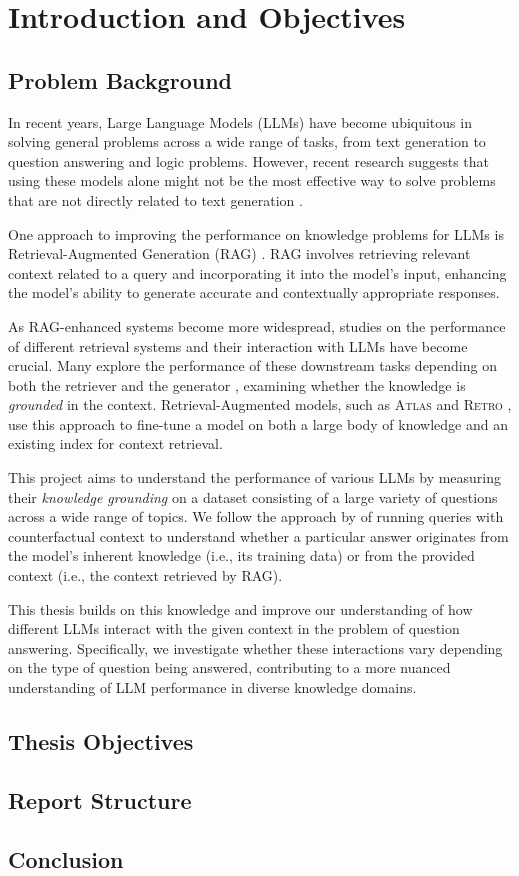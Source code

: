 \section{Introduction and Objectives}

\subsection{Problem Background}

In recent years, Large Language Models (LLMs) have become ubiquitous in solving general problems across a wide range of tasks, from text generation to question answering and logic problems.
However, recent research suggests that using these models alone might not be the most effective way to solve problems that are not directly related to text generation \citep{treeofthoughts}.

One approach to improving the performance on knowledge problems for LLMs is Retrieval-Augmented Generation (RAG) \citep{rag}. RAG involves retrieving relevant context related to a query and incorporating it into the model's input, enhancing the model's ability to generate accurate and contextually appropriate responses.

As RAG-enhanced systems become more widespread, studies on the performance of different retrieval systems and their interaction with LLMs have become crucial.
Many explore the performance of these downstream tasks depending on both the retriever and the generator \citep{can_rag_models_reason,fewshotlearners}, examining whether the knowledge is \textit{grounded} in the context.
Retrieval-Augmented models, such as \textsc{Atlas} \citep{atlas_foundational} and \textsc{Retro} \citep{retro}, use this approach to fine-tune a model on both a large body of knowledge and an existing index for context retrieval.

This project aims to understand the performance of various LLMs by measuring their \textit{knowledge grounding} on a dataset consisting of a large variety of questions across a wide range of topics.
We follow the approach by \citeauthor{factual_recall} of running queries with counterfactual context to understand whether a particular answer originates from the model's inherent knowledge (i.e., its training data) or from the provided context (i.e., the context retrieved by RAG).

This thesis builds on this knowledge and improve our understanding of how different LLMs interact with the given context in the problem of question answering.
Specifically, we investigate whether these interactions vary depending on the type of question being answered, contributing to a more nuanced understanding of LLM performance in diverse knowledge domains.

\subsection{Thesis Objectives}

\subsection{Report Structure}

\subsection{Conclusion}

